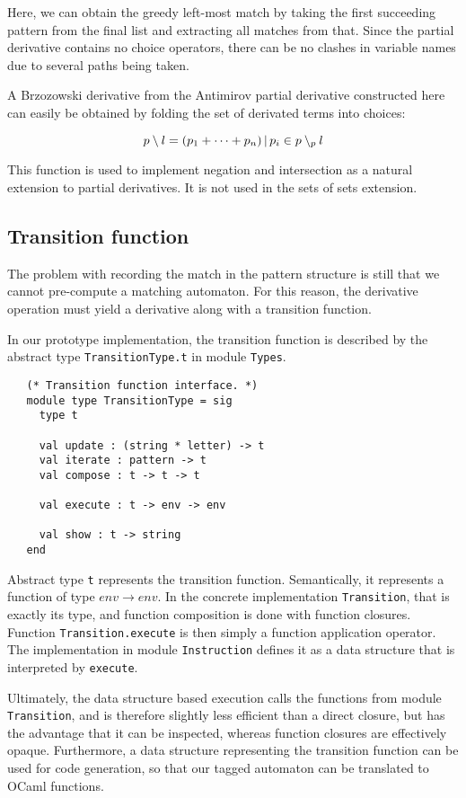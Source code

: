 Here, we can obtain the greedy left-most match by taking the first succeeding
pattern from the final list and extracting all matches from that. Since the
partial derivative contains no choice operators, there can be no clashes in
variable names due to several paths being taken.

A Brzozowski derivative from the Antimirov partial derivative constructed here
can easily be obtained by folding the set of derivated terms into choices:

\[p \setminus l = (p_1 + \dots + p_n) \operatorname{|} p_i \in p \setminus_p l \]

This function is used to implement negation and intersection as a natural
extension to partial derivatives. It is not used in the sets of sets extension.


\subsection{Transition function}

The problem with recording the match in the pattern structure is still that we
cannot pre-compute a matching automaton. For this reason, the derivative
operation must yield a derivative along with a transition function.

In our prototype implementation, the transition function is described by the
abstract type \texttt{TransitionType.t} in module \texttt{Types}.

\begin{lstlisting}
   (* Transition function interface. *)
   module type TransitionType = sig
     type t

     val update : (string * letter) -> t
     val iterate : pattern -> t
     val compose : t -> t -> t

     val execute : t -> env -> env

     val show : t -> string
   end
\end{lstlisting}

Abstract type \texttt{t} represents the transition function. Semantically, it
represents a function of type $\mathit{env} \to \mathit{env}$. In the concrete
implementation \texttt{Transition}, that is exactly its type, and function
composition is done with function closures. Function \texttt{Transition.execute}
is then simply a function application operator. The implementation in module
\texttt{Instruction} defines it as a data structure that is interpreted by
\texttt{execute}.

Ultimately, the data structure based execution calls the functions from module
\texttt{Transition}, and is therefore slightly less efficient than a direct
closure, but has the advantage that it can be inspected, whereas function
closures are effectively opaque. Furthermore, a data structure representing the
transition function can be used for code generation, so that our tagged
automaton can be translated to OCaml functions.

